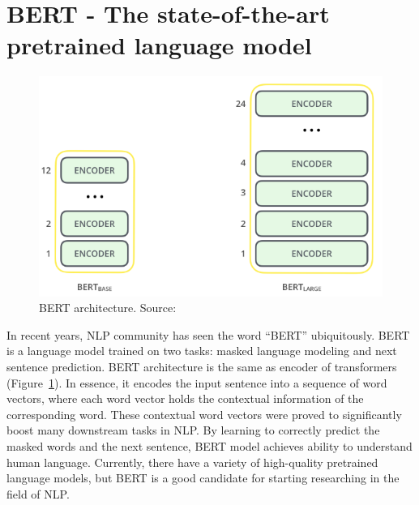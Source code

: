 \documentclass[12pt, sort&compress]{report}
\begin{document}
\section{BERT - The state-of-the-art pretrained language model}
\label{2.4}
\begin{figure}[!htbp]
	\centering
	\includegraphics[scale=.6]{images/bert.png}
	\caption{BERT architecture. Source: \cite{bert}}
	\label{fig:2:05}
\end{figure}
\par In recent years, NLP community has seen the word “BERT” ubiquitously. BERT is a language model trained on two tasks: masked language modeling and next sentence prediction. BERT architecture is the same as encoder of transformers (Figure~\ref{fig:2:05}). In essence, it encodes the input sentence into a sequence of word vectors, where each word vector holds the contextual information of the corresponding word. These contextual word vectors were proved to significantly boost many downstream tasks in NLP. By learning to correctly predict the masked words and the next sentence, BERT model achieves ability to understand human language. Currently, there have a variety of high-quality pretrained language models, but BERT is a good candidate for starting researching in the field of NLP.
\newpage
\end{document}
